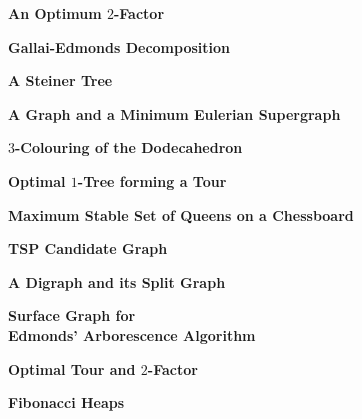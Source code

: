 \documentclass{report}
\begin{document}
\begin{center}
\vfill
\epsfxsize=10cm

\vspace{1cm}
{\bf An Optimum $2$-Factor}
\vfill

\clearpage

\vfill
\epsfxsize=10cm

\vspace{1cm}
{\bf Gallai-Edmonds Decomposition}
\vfill


\vfill
\epsfxsize=12cm

\vspace{1cm}
{\bf A Steiner Tree}
\vfill

\clearpage

\vfill
\epsfxsize=4.5cm
\epsfxsize=4.5cm
\hspace*{2cm}

\vspace{1cm}
{\bf A Graph and a Minimum Eulerian Supergraph}
\vfill


\vfill
\epsfxsize=7cm

\vspace{1cm}
{\bf $3$-Colouring of the Dodecahedron}
\vfill

\clearpage

\vfill
\epsfxsize=9cm

\vspace{1cm}
{\bf Optimal $1$-Tree forming a Tour}
\vfill


\vfill
\epsfxsize=6.5cm

\vspace{1cm}
{\bf Maximum Stable Set of Queens on a Chessboard}
\vfill

\clearpage

\vfill
{}

\vspace{1cm}
{\bf TSP Candidate Graph}
\vfill


\vfill
\epsfxsize=3.5cm
\epsfxsize=7cm
\hspace*{1cm}

\vspace{1cm}
{\bf A Digraph and its Split Graph}
\vfill

\clearpage

\vfill
\epsfxsize=11cm

\vspace{0.5cm}
{\bf Surface Graph for \\ Edmonds' Arborescence Algorithm}
\vfill


\vfill
\epsfxsize=11cm

\vspace{1cm}
{\bf Optimal Tour and $2$-Factor}
\vfill

\clearpage

\vfill
\epsfxsize=12cm

\vspace{0.5cm}
{\bf Fibonacci Heaps}
\vfill

\end{center}
\end{document}
